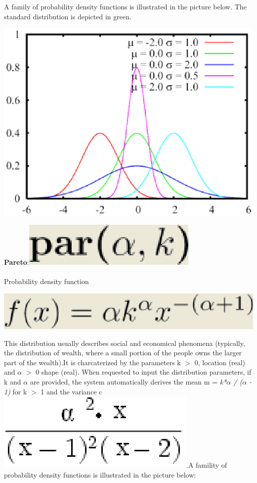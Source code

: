 A family of probability density functions is illustrated in the picture below. The standard distribution is depicted in green.\\
\begin{center}
\includegraphics[scale=.5]{img/jsim/norm_pdf.eps}
\end{center}
\textbf{Pareto}:\includegraphics[scale=.5]{img/jsim/paretp_f.eps}\\\\
Probability density function\\
\begin{center}
\includegraphics[scale=.5]{img/jsim/pareto1.eps}
\end{center}
This distribution usually describes  social and economical phenomena (typically, the distribution of wealth, where a small portion of the people owns the larger part of the wealth).It is charcaterized by the parameters k $>$ 0, location (real) and  $\alpha$ $>$ 0 shape (real).
When requested to input the distribution parameters, if k and $\alpha$ are provided, the system automatically derives the  mean m = \emph{k*$\alpha$ / ($\alpha$ - 1)} for k $>$ 1 and the variance c \includegraphics[scale=.5]{img/jsim/pareto_c.eps}.A famility of probability density functions  is illustrated in the picture below:\\
